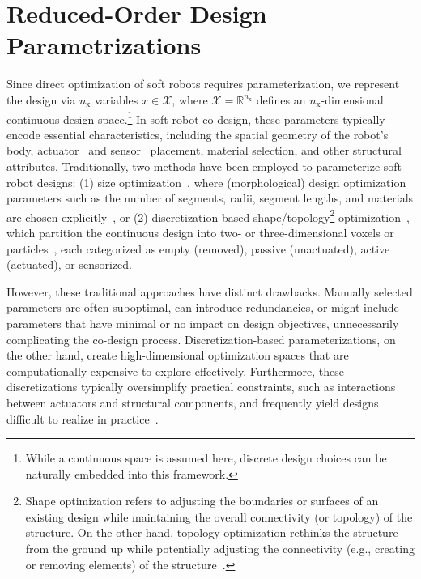 \section{Reduced-Order Design Parametrizations}\label{sec:apx:holisticcodesign:reduced_order_design_parametrizations}
Since direct optimization of soft robots requires parameterization, we represent the design via $n_\mathrm{x}$ variables $x \in \mathcal{X}$, where $\mathcal{X} = \mathbb{R}^{n_\mathrm{x}}$ defines an $n_\mathrm{x}$-dimensional continuous design space.\footnote{While a continuous space is assumed here, discrete design choices can be naturally embedded into this framework.} In soft robot co-design, these parameters typically encode essential characteristics, including the spatial geometry of the robot’s body, actuator~\citep{wang2024diffusebot} and sensor~\citep{spielberg2021co, junge2022leveraging} placement, material selection, and other structural attributes. Traditionally, two methods have been employed to parameterize soft robot designs: (1) size optimization~\citep{chen2020design}, where (morphological) design optimization parameters such as the number of segments, radii, segment lengths, and materials are chosen explicitly~\citep{guan2023trimmed, calisti2011octopus, pagliarani2024variable, polygerinos2015modeling, navez2024design, junge2022leveraging}, or (2) discretization-based shape/topology\footnote{Shape optimization refers to adjusting the boundaries or surfaces of an existing design while maintaining the overall connectivity (or topology) of the structure. On the other hand, topology optimization rethinks the structure from the ground up while potentially adjusting the connectivity (e.g., creating or removing elements) of the structure~\citep{chen2020design}.} optimization~\citep{chen2020design}, which partition the continuous design into two- or three-dimensional voxels or particles~\citep{caasenbrood2020computational, pinskier2024diversity, bhatia2021evolution, medvet2022impact, wang2022curriculum, nadizar2022schedule}, each categorized as empty (removed), passive (unactuated), active (actuated), or sensorized.

However, these traditional approaches have distinct drawbacks. Manually selected parameters are often suboptimal, can introduce redundancies, or might include parameters that have minimal or no impact on design objectives, unnecessarily complicating the co-design process. Discretization-based parameterizations, on the other hand, create high-dimensional optimization spaces that are computationally expensive to explore effectively. Furthermore, these discretizations typically oversimplify practical constraints, such as interactions between actuators and structural components, and frequently yield designs difficult to realize in practice~\citep{legrand2023reconfigurable}.


